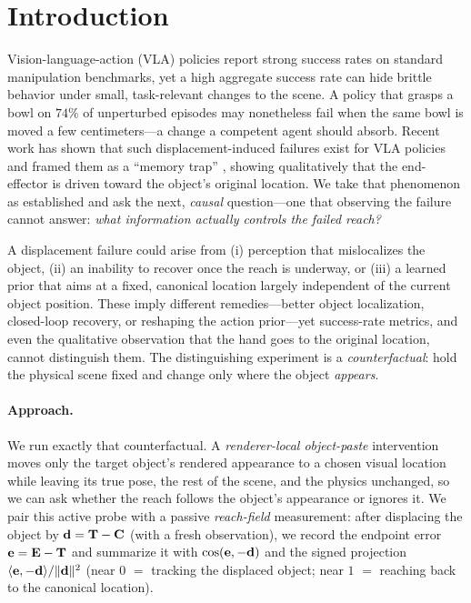 \section{Introduction}
\label{sec:intro}

Vision-language-action (VLA) policies report strong success rates on standard manipulation benchmarks, yet a high aggregate success rate can hide brittle behavior under small, task-relevant changes to the scene. A policy that grasps a bowl on $74\%$ of unperturbed episodes may nonetheless fail when the same bowl is moved a few centimeters---a change a competent agent should absorb. Recent work has shown that such displacement-induced failures exist for VLA policies and framed them as a ``memory trap'' \citep{afi2025memorytrap}, showing qualitatively that the end-effector is driven toward the object's original location. We take that phenomenon as established and ask the next, \emph{causal} question---one that observing the failure cannot answer: \emph{what information actually controls the failed reach?}

A displacement failure could arise from (i) perception that mislocalizes the object, (ii) an inability to recover once the reach is underway, or (iii) a learned prior that aims at a fixed, canonical location largely independent of the current object position. These imply different remedies---better object localization, closed-loop recovery, or reshaping the action prior---yet success-rate metrics, and even the qualitative observation that the hand goes to the original location, cannot distinguish them. The distinguishing experiment is a \emph{counterfactual}: hold the physical scene fixed and change only where the object \emph{appears}.

\paragraph{Approach.} We run exactly that counterfactual. A \emph{renderer-local object-paste} intervention moves only the target object's rendered appearance to a chosen visual location while leaving its true pose, the rest of the scene, and the physics unchanged, so we can ask whether the reach follows the object's appearance or ignores it. We pair this active probe with a passive \emph{reach-field} measurement: after displacing the object by $\mathbf{d}=\mathbf{T}-\mathbf{C}$ (with a fresh observation), we record the endpoint error $\mathbf{e}=\mathbf{E}-\mathbf{T}$ and summarize it with $\operatorname{cos}(\mathbf{e},-\mathbf{d})$ and the signed projection $\langle\mathbf{e},-\mathbf{d}\rangle/\lVert\mathbf{d}\rVert^2$ (near $0$ $=$ tracking the displaced object; near $1$ $=$ reaching back to the canonical location).

